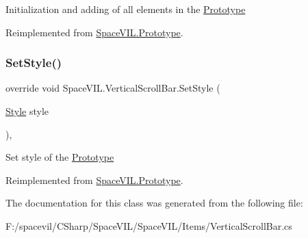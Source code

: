 Initialization and adding of all elements in the \mbox{\hyperlink{class_space_v_i_l_1_1_prototype}{Prototype}} 



Reimplemented from \mbox{\hyperlink{class_space_v_i_l_1_1_prototype_ac3379fe02923ee155b5b0084abf27420}{Space\+V\+I\+L.\+Prototype}}.

\mbox{\label{class_space_v_i_l_1_1_vertical_scroll_bar_a94bfbdb137de9b7301e6e07074eb2069}} 
\subsubsection{\texorpdfstring{Set\+Style()}{SetStyle()}}
{\footnotesize\ttfamily override void Space\+V\+I\+L.\+Vertical\+Scroll\+Bar.\+Set\+Style (\begin{DoxyParamCaption}\item[{\mbox{\hyperlink{class_space_v_i_l_1_1_decorations_1_1_style}{Style}}}]{style }\end{DoxyParamCaption})\hspace{0.3cm}{\ttfamily [inline]}, {\ttfamily [virtual]}}



Set style of the \mbox{\hyperlink{class_space_v_i_l_1_1_prototype}{Prototype}} 



Reimplemented from \mbox{\hyperlink{class_space_v_i_l_1_1_prototype_ae96644a6ace490afb376fb542161e541}{Space\+V\+I\+L.\+Prototype}}.



The documentation for this class was generated from the following file\+:\begin{DoxyCompactItemize}
\item 
F\+:/spacevil/\+C\+Sharp/\+Space\+V\+I\+L/\+Space\+V\+I\+L/\+Items/Vertical\+Scroll\+Bar.\+cs\end{DoxyCompactItemize}
